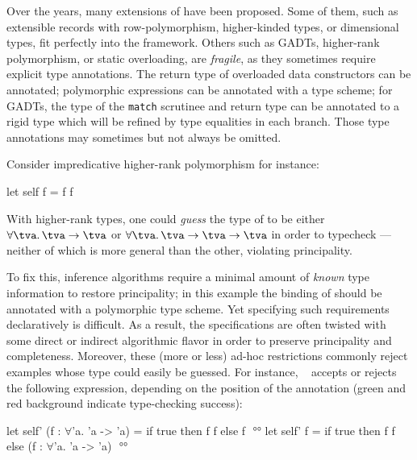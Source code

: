 \documentclass[acmsmall,screen,nonacm,review]{acmart}
\begin{document}

Over the years, many extensions of \ML have been proposed. Some of
them, such as extensible records with row-polymorphism, higher-kinded
types, or dimensional types, fit perfectly into the \ML
framework. Others such as GADTs, higher-rank polymorphism, or static
overloading, are \emph{fragile}, as they sometimes require explicit
type annotations. The return type of overloaded data constructors can
be annotated; polymorphic expressions can be annotated with a type
scheme; for GADTs, the type of the \texttt{match} scrutinee and return
type can be annotated to a rigid type which will be refined by type
equalities in each branch. Those type annotations may sometimes but
not always be omitted.

Consider impredicative higher-rank polymorphism for instance:
\begin{program}[input]
let self f = f f
\end{program}
With higher-rank types, one could \emph{guess} the type of  to be
either $\tfor \tv \tv \to \tv$ or $\tfor \tv \tv \to \tv \to \tv$ in order
to typecheck ---neither of which is more general than the other,
violating principality.


To fix this, inference algorithms require a minimal amount of
\emph{known} type information to restore principality; in this example
the binding of  should be annotated with a polymorphic type
scheme. Yet specifying such requirements declaratively is
difficult. As a result, the specifications are often twisted with some
direct or indirect algorithmic flavor in order to preserve
principality and completeness.
%
Moreover, these (more or less) ad-hoc restrictions commonly reject examples
whose type could easily be guessed. For instance, \MLF~\cite{LeBotlan-Remy/recasting-mlf} accepts
or rejects the following expression, depending on the position of the
annotation (green and red background indicate type-checking success):
\begin{program}[input]
let self' (f : $\forall$'a. 'a -> 'a) = if true then f f else f $
$   °°
let self' f = if true then f f else (f : $\forall$'a. 'a -> 'a) $
$   °°
\end{program}

\end{document}
